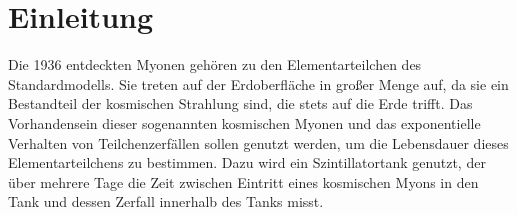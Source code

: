 \section{Einleitung}
    Die 1936 entdeckten Myonen gehören zu den Elementarteilchen des Standardmodells. Sie treten auf der Erdoberfläche in großer Menge auf, da sie ein Bestandteil der kosmischen Strahlung sind, die stets auf die 
    Erde trifft. Das Vorhandensein dieser sogenannten kosmischen Myonen und das exponentielle Verhalten von Teilchenzerfällen sollen genutzt werden, um die Lebensdauer dieses Elementarteilchens zu bestimmen. 
    Dazu wird ein Szintillatortank genutzt, der über mehrere Tage die Zeit zwischen Eintritt eines kosmischen Myons in den Tank und dessen Zerfall innerhalb des Tanks misst.      